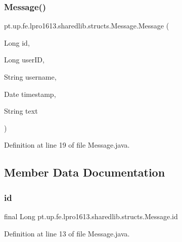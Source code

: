 \subsubsection{\texorpdfstring{Message()}{Message()}}
{\footnotesize\ttfamily pt.\+up.\+fe.\+lpro1613.\+sharedlib.\+structs.\+Message.\+Message (\begin{DoxyParamCaption}\item[{Long}]{id,  }\item[{Long}]{user\+ID,  }\item[{String}]{username,  }\item[{Date}]{timestamp,  }\item[{String}]{text }\end{DoxyParamCaption})}



Definition at line 19 of file Message.\+java.



\subsection{Member Data Documentation}
\hypertarget{classpt_1_1up_1_1fe_1_1lpro1613_1_1sharedlib_1_1structs_1_1_message_a4a07e278bc5c3189bc9bea184f64f30f}{}\label{classpt_1_1up_1_1fe_1_1lpro1613_1_1sharedlib_1_1structs_1_1_message_a4a07e278bc5c3189bc9bea184f64f30f} 
\subsubsection{\texorpdfstring{id}{id}}
{\footnotesize\ttfamily final Long pt.\+up.\+fe.\+lpro1613.\+sharedlib.\+structs.\+Message.\+id}



Definition at line 13 of file Message.\+java.

\hypertarget{classpt_1_1up_1_1fe_1_1lpro1613_1_1sharedlib_1_1structs_1_1_message_a34a1763aeacd9c6d6c6e80463af8ed3c}{}\label{classpt_1_1up_1_1fe_1_1lpro1613_1_1sharedlib_1_1structs_1_1_message_a34a1763aeacd9c6d6c6e80463af8ed3c} 
